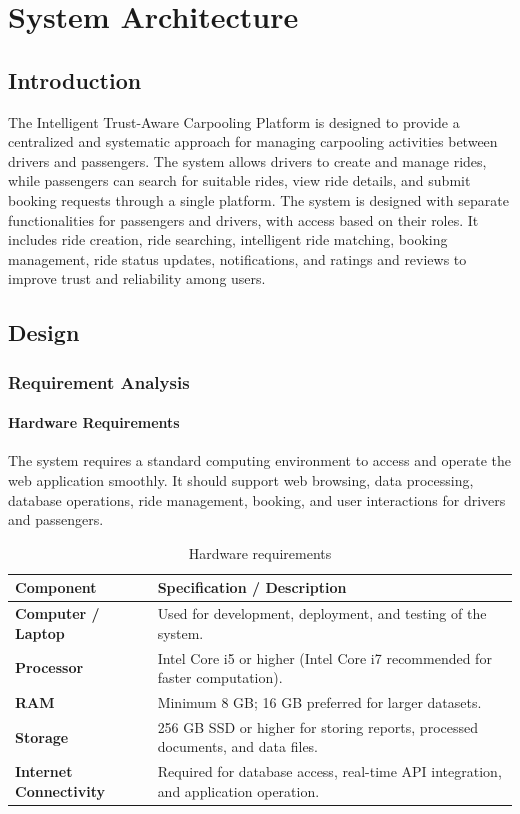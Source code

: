 \documentclass[12pt,a4paper,oneside]{report}
\begin{document}
\chapter{System Architecture}

\section{Introduction}
The Intelligent Trust-Aware Carpooling Platform is designed to provide a
centralized and systematic approach for managing carpooling activities between
drivers and passengers. The system allows drivers to create and manage rides,
while passengers can search for suitable rides, view ride details, and submit
booking requests through a single platform. The system is designed with
separate functionalities for passengers and drivers, with access based on
their roles. It includes ride creation, ride searching, intelligent ride
matching, booking management, ride status updates, notifications, and ratings
and reviews to improve trust and reliability among users.

\section{Design}

\subsection{Requirement Analysis}
\subsubsection*{Hardware Requirements}
The system requires a standard computing environment to access and operate the
web application smoothly. It should support web browsing, data processing,
database operations, ride management, booking, and user interactions for
drivers and passengers.

\begin{table}[H]
\centering
\caption{Hardware requirements}
\begin{tabularx}{0.92\textwidth}{|>{\bfseries}p{}|X|}
\hline
Component & \textbf{Specification / Description}\\
\hline
Computer / Laptop & Used for development, deployment, and testing of the system.\\
\hline
Processor & Intel Core i5 or higher (Intel Core i7 recommended for faster computation).\\
\hline
RAM & Minimum 8 GB; 16 GB preferred for larger datasets.\\
\hline
Storage & 256 GB SSD or higher for storing reports, processed documents, and data files.\\
\hline
Internet Connectivity & Required for database access, real-time API integration, and application operation.\\
\hline
\end{tabularx}
\end{table}
\end{document}
